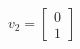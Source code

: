 \documentclass{article}
\begin{document}
\begin{align*}
v_2=\begin{bmatrix}0\\1\end{bmatrix}
\end{align*}
\end{document}
